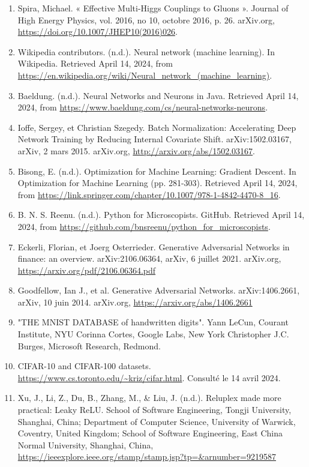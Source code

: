 \documentclass [12pt] {article}
\numberwithin{equation}{section} %
\numberwithin{figure}{section}   %
\begin{document}
\begin{enumerate}
    \item Spira, Michael. « Effective Multi-Higgs Couplings to Gluons ». Journal of High Energy Physics, vol. 2016, no 10, octobre 2016, p. 26. arXiv.org, \url{https://doi.org/10.1007/JHEP10(2016)026}. \label{33.47}
    \item Wikipedia contributors. (n.d.). Neural network (machine learning). In Wikipedia. Retrieved April 14, 2024, from \url{https://en.wikipedia.org/wiki/Neural_network_(machine_learning)}. \label{NN_wiki}
    \item Baeldung. (n.d.). Neural Networks and Neurons in Java. Retrieved April 14, 2024, from \url{https://www.baeldung.com/cs/neural-networks-neurons}. \label{concept of neurons}
    \item Ioffe, Sergey, et Christian Szegedy. Batch Normalization: Accelerating Deep Network Training by Reducing Internal Covariate Shift. arXiv:1502.03167, arXiv, 2 mars 2015. arXiv.org, \url{http://arxiv.org/abs/1502.03167}. \label{batch}
    \item Bisong, E. (n.d.). Optimization for Machine Learning: Gradient Descent. In Optimization for Machine Learning (pp. 281-303). Retrieved April 14, 2024, from \url{https://link.springer.com/chapter/10.1007/978-1-4842-4470-8_16}. \label{learning rate + sgd}
    \item B. N. S. Reenu. (n.d.). Python for Microscopists. GitHub. Retrieved April 14, 2024, from \url{https://github.com/bnsreenu/python_for_microscopists}.\label{github GAN}
    \item Eckerli, Florian, et Joerg Osterrieder. Generative Adversarial Networks in finance: an overview. arXiv:2106.06364, arXiv, 6 juillet 2021. arXiv.org, \url{https://arxiv.org/pdf/2106.06364.pdf} \label{Finance}
    \item Goodfellow, Ian J., et al. Generative Adversarial Networks. arXiv:1406.2661, arXiv, 10 juin 2014. arXiv.org, \url{https://arxiv.org/abs/1406.2661} \label{GAN original}
    \item  "THE MNIST DATABASE of handwritten digits". Yann LeCun, Courant Institute, NYU Corinna Cortes, Google Labs, New York Christopher J.C. Burges, Microsoft Research, Redmond. \label{MNIST}
    \item CIFAR-10 and CIFAR-100 datasets. \url{https://www.cs.toronto.edu/~kriz/cifar.html}. Consulté le 14 avril 2024.\label{CIFAR10}
    \item Xu, J., Li, Z., Du, B., Zhang, M., & Liu, J. (n.d.). Reluplex made more practical: Leaky ReLU. School of Software Engineering, Tongji University, Shanghai, China; Department of Computer Science, University of Warwick, Coventry, United Kingdom; School of Software Engineering, East China Normal University, Shanghai, China, \url{https://ieeexplore.ieee.org/stamp/stamp.jsp?tp=&arnumber=9219587} \label{leaky relu}

\end{enumerate}
\end{document}
